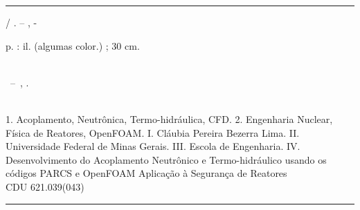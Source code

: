 \documentclass[12pt,openright,twoside,a4paper,english,french,spanish,brazil]{abntex2}
\begin{document}
\frenchspacing 

\pretextual



\imprimirfolhaderosto*


%
%     
\begin{fichacatalografica}
	\vspace*{\fill}					%
	\hrule							%
	\begin{center}					%
	\begin{minipage}[c]{12.5cm}		%
	
	\imprimirautor
	
	\hspace{0.5cm} \imprimirtitulo  / \imprimirautor. --
	\imprimirlocal, \imprimirdata-
	
	\hspace{0.5cm} \pageref{LastPage} p. : il. (algumas color.) ; 30 cm.\\
	
	\hspace{0.5cm} \imprimirorientadorRotulo~\imprimirorientador\\
	
	\hspace{0.5cm}
	\parbox[t]{\textwidth}{\imprimirtipotrabalho~--~\imprimirinstituicao,
	\imprimirdata.}\\
	
	\hspace{0.5cm}
		1. Acoplamento, Neutrônica, Termo-hidráulica, CFD.
		2. Engenharia Nuclear, Física de Reatores, OpenFOAM.
		I. Cláubia Pereira Bezerra Lima.
		II. Universidade Federal de Minas Gerais.
		III. Escola de Engenharia.
		IV. Desenvolvimento do Acoplamento Neutrônico e Termo-hidráulico 
                usando os códigos PARCS e OpenFOAM Aplicação à Segurança de Reatores\\ 			
	
	\hspace{8.75cm} CDU 621.039(043)\\
	
	\end{minipage}
	\end{center}
	\hrule
\end{fichacatalografica}
\end{document}
